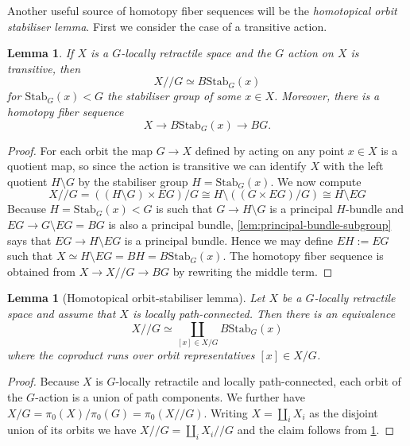 \documentclass{amsart}
\theoremstyle{plain}
\newtheorem{lem}[thm]{Lemma}
\theoremstyle{definition}
\newcommand{\hq}{/\!\!/} %
\begin{document}
Another useful source of homotopy fiber sequences will be the \emph{homotopical orbit stabiliser lemma}.
First we consider the case of a transitive action.
\begin{lem}\label{lem:orbit-stabiliser-transitive}
    If $X$ is a $G$-locally retractile space and the $G$ action on $X$ is transitive, 
    then 
    \[
        X\hq G \simeq B\mathrm{Stab}_G(x)
    \]
    for $\mathrm{Stab}_G(x) < G$ the stabiliser group of some $x \in X$.
    Moreover, there is a homotopy fiber sequence
    \[
        X \longrightarrow B\mathrm{Stab}_G(x) \longrightarrow BG.
    \]
\end{lem}
\begin{proof}
    For each orbit the map $G \to X$ defined by acting on any point $x \in X$ is a quotient map, so since the action is transitive we can identify $X$ with the left quotient $H\setminus G$ by the stabiliser group $H = \mathrm{Stab}_G(x)$.
    We now compute
    \[
        X \hq G = ((H \setminus G) \times EG)/G
        \cong H \setminus ((G \times EG)/G)
        \cong H \setminus EG
    \]
    Because $H = \mathrm{Stab}_G(x) < G$ is such that $G \to H \setminus G$ is a principal $H$-bundle and $EG \to G \setminus EG = BG$ is also a principal bundle, \cref{lem:principal-bundle-subgroup} says that $EG \to H \setminus EG$ is a principal bundle.
    Hence we may define $EH := EG$ such that $X \simeq H \setminus EG = BH =  B\mathrm{Stab}_G(x)$.
    The homotopy fiber sequence is obtained from $X \to X\hq G \to BG$ by rewriting the middle term.
\end{proof}



\begin{lem}[Homotopical orbit-stabiliser lemma]\label{lem:orbit-stabiliser-v2}
    Let $X$ be a $G$-locally retractile space 
    and assume that $X$ is locally path-connected.
    Then there is an equivalence
    \[
        X\hq G \simeq \coprod_{[x] \in X/G} B\mathrm{Stab}_G(x)
    \]
    where the coproduct runs over orbit representatives $[x]\in X/G$.
\end{lem}
\begin{proof}
    Because $X$ is $G$-locally retractile and locally path-connected, each orbit of the $G$-action is a union of path components.
    We further have $X/G = \pi_0(X)/\pi_0(G) = \pi_0(X\hq G)$.
    Writing $X = \coprod_i X_i$ as the disjoint union of its orbits we have $X \hq G = \coprod_i X_i \hq G$
    and the claim follows from \cref{lem:orbit-stabiliser-transitive}.
\end{proof}
\end{document}
